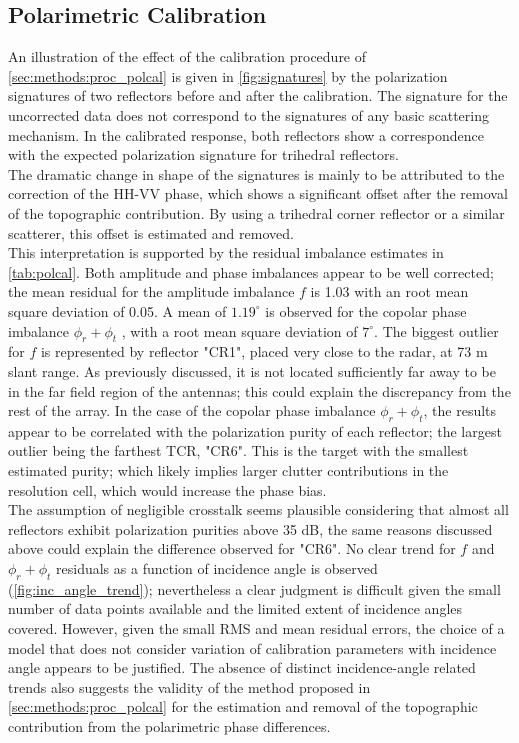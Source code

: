 \subsection{Polarimetric Calibration}
An illustration of the effect of the calibration procedure of \autoref{sec:methods:proc_polcal} is given in  \autoref{fig:signatures} by the polarization signatures of two reflectors before and after the calibration.
The signature for the uncorrected data does not correspond to the signatures of any basic scattering mechanism. In the calibrated response, both reflectors show a correspondence with the expected polarization signature for trihedral reflectors.\\ The dramatic change in shape of the signatures is mainly to be attributed to the correction of the HH-VV phase, which shows a significant offset after the removal of the topographic contribution. By using a trihedral corner reflector or a similar scatterer, this offset is estimated and removed.\\
This interpretation is supported by the residual imbalance estimates in \autoref{tab:polcal}.
Both amplitude and  phase imbalances appear to be well corrected; the mean residual for the amplitude imbalance $f$ is 1.03 with an root mean square deviation of 0.05. A mean of $1.19^\circ$ is observed for the copolar phase imbalance $\phi_r + \phi_t$ , with a root mean square deviation of $7^\circ$. The biggest outlier for $f$ is represented by reflector "CR1", placed very close to the radar, at 73 m slant range. As previously discussed, it is not located sufficiently far away to be in the far field region of the antennas; this could explain the discrepancy from the rest of the array. In the case of the copolar phase imbalance $\phi_r + \phi_t$, the results appear to be correlated with the polarization purity of each reflector; the largest outlier being the farthest TCR, "CR6". This is the target with the smallest estimated purity; which likely implies larger clutter contributions in the resolution cell, which would increase the phase bias.\\
The assumption of negligible crosstalk seems plausible considering that almost all reflectors exhibit polarization purities above 35 dB, the same reasons discussed above could explain the difference observed for  "CR6".
No clear trend for $f$ and $\phi_r + \phi_t$ residuals as a function of incidence angle is observed (\autoref{fig:inc_angle_trend}); nevertheless a clear judgment is difficult given the small number of data points available and the limited extent of incidence angles covered. However, given the small RMS and mean residual errors, the choice of a model that does not consider variation of calibration parameters with incidence angle appears to be justified. The absence of distinct incidence-angle related trends also suggests the validity of the method proposed in \autoref{sec:methods:proc_polcal} for the estimation and removal of the topographic contribution from the polarimetric phase differences.\\
